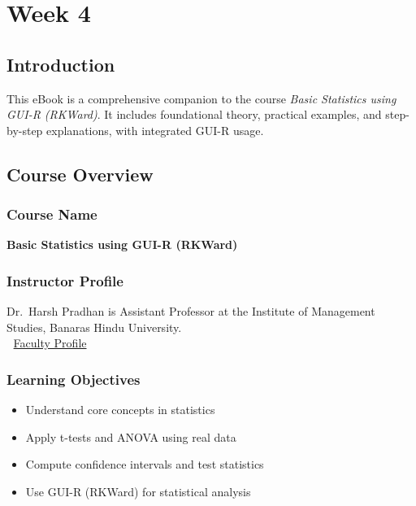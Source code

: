 \documentclass[
  letterpaper,
  DIV=11,
  numbers=noendperiod]{scrreprt}
\providecommand{\tightlist}{%
  \setlength{\itemsep}{0pt}\setlength{\parskip}{0pt}}
\begin{document}
\chapter{Week 4}\label{week-4}

\section{Introduction}\label{introduction-3}

This eBook is a comprehensive companion to the course \emph{Basic
Statistics using GUI-R (RKWard)}. It includes foundational theory,
practical examples, and step-by-step explanations, with integrated GUI-R
usage.

\section{Course Overview}\label{course-overview}

\subsection{Course Name}\label{course-name}

\textbf{Basic Statistics using GUI-R (RKWard)}

\subsection{Instructor Profile}\label{instructor-profile}

Dr.~Harsh Pradhan is Assistant Professor at the Institute of Management
Studies, Banaras Hindu University.\\
📎 \href{https://bhu.ac.in/Site/FacultyProfile/1_5?FA000562}{Faculty
Profile}

\subsection{Learning Objectives}\label{learning-objectives}

\begin{itemize}
\tightlist
\item
  Understand core concepts in statistics
\item
  Apply t-tests and ANOVA using real data
\item
  Compute confidence intervals and test statistics
\item
  Use GUI-R (RKWard) for statistical analysis
\end{itemize}
\end{document}
